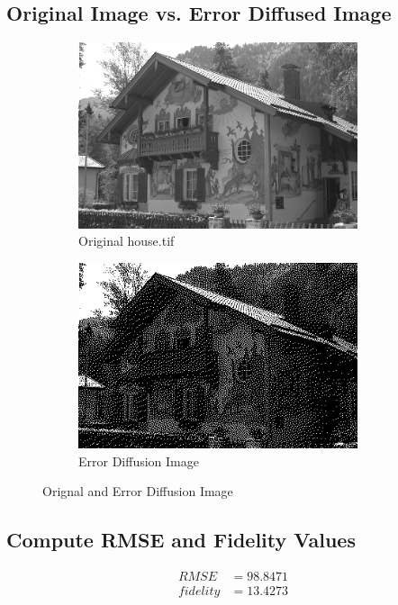 \documentclass{article}
\begin{document}
\subsection{Original Image vs. Error Diffused Image}
	\begin{figure}[h]
		\begin{subfigure}{0.5\textwidth}
			\includegraphics[width=0.9\textwidth]{house.png}
			\caption{Original house.tif}
		\end{subfigure}
		\begin{subfigure}{0.5\textwidth}
			\includegraphics[width=0.9\textwidth]{house_ed.png}
			\caption{Error Diffusion Image}
		\end{subfigure}
		\caption{Orignal and Error Diffusion Image}
	\end{figure}

\subsection{Compute RMSE and Fidelity Values}
	\begin{align*}
		RMSE &= 98.8471 \\
		fidelity &= 13.4273
	\end{align*}
\end{document}
